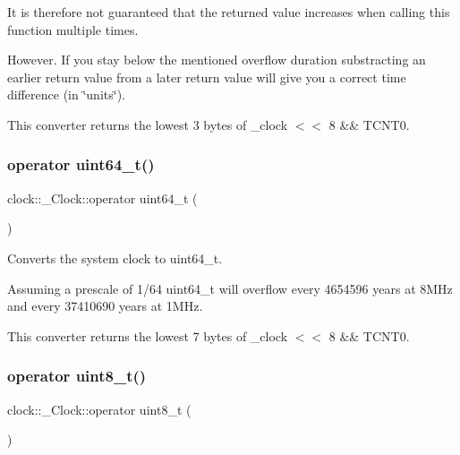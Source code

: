 It is therefore not guaranteed that the returned value increases when calling this function multiple times.

However. If you stay below the mentioned overflow duration substracting an earlier return value from a later return value will give you a correct time difference (in \char`\"{}units\char`\"{}).

This converter returns the lowest 3 bytes of \+\_\+clock $<$$<$ 8 \&\& {\ttfamily T\+C\+N\+T0}. \hypertarget{classclock_1_1__Clock_a2be32ac8c4e823da6dd966f5d19c7032}{}\label{classclock_1_1__Clock_a2be32ac8c4e823da6dd966f5d19c7032} 
\subsubsection{\texorpdfstring{operator uint64\+\_\+t()}{operator uint64\_t()}}
{\footnotesize\ttfamily clock\+::\+\_\+\+Clock\+::operator uint64\+\_\+t (\begin{DoxyParamCaption}{ }\end{DoxyParamCaption})\hspace{0.3cm}{\ttfamily [inline]}}



Converts the system clock to {\ttfamily uint64\+\_\+t}. 

Assuming a prescale of 1/64 {\ttfamily uint64\+\_\+t} will overflow every 4\textquotesingle{}654\textquotesingle{}596 years at 8\+M\+Hz and every 37\textquotesingle{}410\textquotesingle{}690 years at 1\+M\+Hz.

This converter returns the lowest 7 bytes of \+\_\+clock $<$$<$ 8 \&\& {\ttfamily T\+C\+N\+T0}. \hypertarget{classclock_1_1__Clock_ab095ca7d0ca8668e5904afb9998133f7}{}\label{classclock_1_1__Clock_ab095ca7d0ca8668e5904afb9998133f7} 
\subsubsection{\texorpdfstring{operator uint8\+\_\+t()}{operator uint8\_t()}}
{\footnotesize\ttfamily clock\+::\+\_\+\+Clock\+::operator uint8\+\_\+t (\begin{DoxyParamCaption}{ }\end{DoxyParamCaption})\hspace{0.3cm}{\ttfamily [inline]}}



